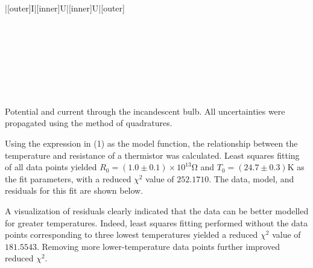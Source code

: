 \begin{paper}
{\begin{papertable}{|[outer]I|[inner]U|[inner]U|[outer]}
			\papertableindex{}\\\paperiline
			\papertableindex{}\\\paperiline
			\papertableindex{}\\\paperiline
			\papertableindex{}\\\paperiline
			\papertableindex{}\\\paperiline
			\papertableindex{}\\\paperiline
			\papertableindex{}\\\paperiline
			\papertableindex{}\\\paperoline
			\end{papertable}\vspace{-1.5em}}
	{Potential and current through the incandescent bulb. All uncertainties were propagated using the method of quadratures.} \vspace{1em}


	Using the expression in (1) as the model function, the relationship between the temperature and resistance of a thermistor was calculated. Least squares fitting of all data points yielded \( R_0 = (1.0 \pm 0.1) \times 10^{13} \si{\ohm} \) and \( T_0 = (24.7 \pm 0.3) \si{\kelvin} \) as the fit parameters, with a reduced \( \chi ^ 2 \) value of \( 252.1710 \). The data, model, and residuals for this fit are shown below.
	
	 \vspace{1em}

	A visualization of residuals clearly indicated that the data can be better modelled for greater temperatures. Indeed, least squares fitting performed without the data points corresponding to three lowest temperatures yielded a reduced \( \chi ^ 2 \) value of \( 181.5543 \). Removing more lower-temperature data points further improved reduced \( \chi ^ 2 \). %
	

\end{paper}
